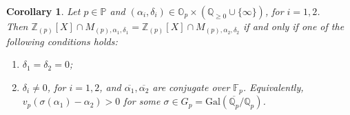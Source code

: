 \documentclass[10pt]{article}
\numberwithin{equation}{section}
\newtheorem{Cor}[equation]{Corollary}
\theoremstyle{definition}
\theoremstyle{definition}
\newcommand{\F}{\mathbb{F}}
\newcommand{\Q}{\mathbb{Q}}
\newcommand{\Z}{\mathbb{Z}}
\renewcommand{\O}{\mathbb{O}}
\newcommand{\PP}{\mathbb{P}}
\newcommand{\oQp}{\overline{\Q_p}}
\newcommand{\Gal}{\text{Gal}}
\begin{document}
\begin{Cor}\label{equality centers on Z[X]}
Let $p\in\PP$ and
$(\alpha_i,\delta_i)\in\O_p\times(\Q_ {\geq0}\cup\{\infty\})$, for $i=1,2$.\\ Then $\Z_{(p)}[X]\cap M_{(p),\alpha_1,\delta_1}=\Z_{(p)}[X]\cap M_{(p),\alpha_2,\delta_2}$ if and only if one of the following conditions holds:
\begin{enumerate}
\item[{\em (a)}]  $\delta_1=\delta_2=0$;
\item[{\em (b)}] $\delta_i\not=0$, for $i=1,2$,  and $\overline{\alpha_1},\overline{\alpha_2}$  are  conjugate over $\F_p$. 
Equivalently, $v_p(\sigma(\alpha_1)-\alpha_2)>0$ for some $\sigma\in G_p=\Gal(\oQp/\Q_p)$.
\end{enumerate}

\end{Cor}
\end{document}
